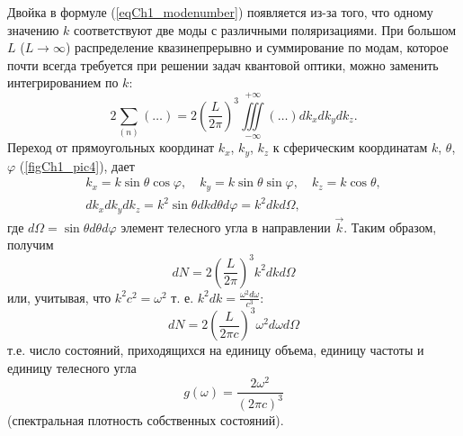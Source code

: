 Двойка в формуле (\ref{eqCh1_modenumber}) появляется из-за того, что
одному значению  $k$  соответствуют две моды с различными
поляризациями. При большом $L$ ($L\rightarrow \infty$)  распределение
квазинепрерывно и суммирование по модам,
которое почти всегда требуется при решении задач квантовой оптики,
можно заменить интегрированием
по $k$: 
\begin{equation}
2 \sum_{(n)} \left( \dots \right) = 2 \left(\frac{L}{2 \pi} \right)^3
\iiint\limits_{-\infty}^{+\infty} \left( \dots \right) d k_x d k_y d k_z.
\label{eqCh1_modenumber_kvazy_contig}
\end{equation}
Переход от прямоугольных координат  $k_x$,  $k_y$, $k_z$   к сферическим координатам  
$k$, $\theta$, $\varphi$    (\autoref{figCh1_pic4}), дает
\begin{eqnarray}
k_x = k \sin \theta \cos \varphi,
\quad 
k_y = k \sin \theta \sin \varphi,
\quad 
k_z  = k \cos \theta,
\nonumber \\
d k_x d k_y d k_z = k^2 \sin \theta d k d \theta d \varphi = k^2 d k
d \Omega,
\end{eqnarray}
где $d \Omega = \sin \theta d \theta d \varphi$ элемент телесного угла в
направлении  $\vec{k}$.  Таким образом, получим
\begin{equation}
d N = 2 \left(\frac{L}{2 \pi} \right)^3 k^2 d k d \Omega
\label{eqCh1_modenumber_1pre}
\end{equation}
или, учитывая, что $k^2 c^2 = \omega^2$ т. е. $k^2 d k =
\frac{\omega^2 d \omega}{c^3}$: 
\begin{equation}
d N = 2 \left(\frac{L}{2 \pi c} \right)^3 \omega^2 d \omega d \Omega
\label{eqCh1_modenumber_1}
\end{equation}
т.е. число состояний, приходящихся на единицу объема, единицу частоты и единицу телесного угла
\begin{equation}
g\left(\omega\right)  = \frac{2 \omega^2}{\left(2 \pi c\right)^3}
\end{equation}
(спектральная плотность собственных состояний). 
